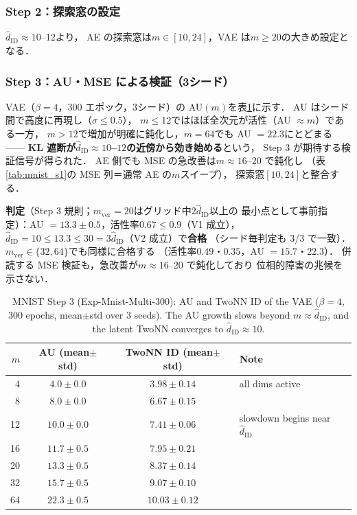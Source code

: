 \documentclass[11pt,a4paper]{jsarticle}
\newcommand{\hatdID}{\hat{d}_{\mathrm{ID}}}
\begin{document}
\subsubsection{Step 2：探索窓の設定}

$\hatdID \approx 10$--$12$より，
AE の探索窓は$m \in [10, 24]$，VAE は$m \geq 20$の大きめ設定となる．

\subsubsection{Step 3：AU・MSE による検証（3シード）}

VAE（$\beta = 4$，300 エポック，3シード）の AU$(m)$を表\ref{tab:mnist_s3}に示す．
AU はシード間で高度に再現し（$\sigma \leq 0.5$），
$m \leq 12$ではほぼ全次元が活性（AU $\approx m$）である一方，
$m > 12$で増加が明確に鈍化し，$m = 64$でも AU $= 22.3$にとどまる——
\textbf{KL 遮断が$\hatdID \approx 10$--$12$の近傍から効き始める}という，
Step 3 が期待する検証信号が得られた．
AE 側でも MSE の急改善は$m \approx 16$--20 で鈍化し
（表\ref{tab:mnist_s1}の MSE 列＝通常 AE の$m$スイープ），
探索窓$[10, 24]$と整合する．

\textbf{判定}（Step 3 規則；$m_{\mathrm{ver}} = 20$はグリッド中$2\hatdID$以上の
最小点として事前指定）：AU $= 13.3 \pm 0.5$，活性率$0.67 \leq 0.9$（V1 成立），
$\hatdID = 10 \leq 13.3 \leq 30 = 3\hatdID$（V2 成立）で\textbf{合格}
（シード毎判定も 3/3 で一致）．
$m_{\mathrm{ver}} \in \{32, 64\}$でも同様に合格する
（活性率$0.49$・$0.35$，AU $= 15.7$・$22.3$）．
併読する MSE 検証も，急改善が$m \approx 16$--20 で鈍化しており
位相的障害の兆候を示さない．

\begin{table}[H]
\centering
\caption{MNIST Step 3 (Exp-Mnist-Multi-300): AU and TwoNN ID of the VAE
($\beta = 4$, 300 epochs, mean$\pm$std over 3 seeds). The AU growth slows
beyond $m \approx \hatdID$, and the latent TwoNN converges to
$\hatdID \approx 10$.}
\label{tab:mnist_s3}
\small
\begin{tabular}{rccl}
\toprule
$m$ & AU (mean$\pm$std) & TwoNN ID (mean$\pm$std) & Note \\
\midrule
 4 & $4.0 \pm 0.0$ & $3.98 \pm 0.14$ & all dims active \\
 8 & $8.0 \pm 0.0$ & $6.67 \pm 0.15$ & \\
12 & $10.0 \pm 0.0$ & $7.41 \pm 0.06$ & slowdown begins near $\hatdID$ \\
16 & $11.7 \pm 0.5$ & $7.95 \pm 0.21$ & \\
20 & $13.3 \pm 0.5$ & $8.37 \pm 0.14$ & \\
32 & $15.7 \pm 0.5$ & $9.07 \pm 0.10$ & \\
64 & $22.3 \pm 0.5$ & $10.03 \pm 0.12$ & \\
\bottomrule
\end{tabular}
\end{table}
\end{document}
